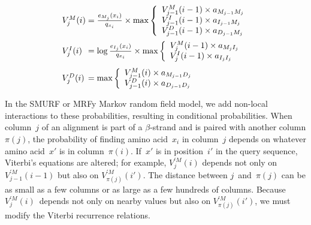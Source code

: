 \documentclass{acm_proc_article-sp}
\begin{document}
\newcommand\txprobj[3][]{a#1_{{#2}_{j-1}{#3}_j}}
\newcommand\txprobjj[3][]{a#1_{{#2}_{j-1}{#3}_j}}
\newcommand\alignwidth{\ensuremath C} %
\newcommand\pairedwith[1]{{\pi(#1)}}

\newcommand\vsum[2]{#2&{}+{}& #1}

\def\goo{18pt}
\def\gum{14pt}

\def\maxiquad{\hskip 1.2em\relax}
\begin{equation}
\begin{array}{@{}l@{}c@{}l}

V_{j}^{M}(i) &{}={}& \frac{e_{M_{j}}(x_{i})}{q_{x_{i}}} \times \max \left\{
  \begin{array}{l@{}c@{}l}
  V_{j-1}^{M}(i - 1) \times a_{M_{j-1}M_{j}}\\
  V_{j-1}^{I}(i - 1) \times a_{I_{j-1}M_{j}}\\
  V_{j-1}^{D}(i - 1) \times a_{D_{j-1}M_{j}}\\
  \end{array} \right.\\[\goo]
V_{j}^{I}(i) &=& \log\frac{e_{I_{j}}(x_{i})}{q_{x_{i}}} \times \max \left\{
  \begin{array}{l@{}c@{}l}
  V_{j}^{M}(i - 1) \times a_{M_{j}I_{j}}\\
  V_{j}^{I}(i - 1) \times a_{I_{j}I_{j}}\\
  \end{array} \right.\\[\gum]
V_{j}^{D}(i) &=& \max \left\{
  \begin{array}{l@{}c@{}l}
  V_{j-1}^{M}(i) \times a_{M_{j-1}D_{j}}\\
  V_{j-1}^{D}(i) \times a_{D_{j-1}D_{j}}\\
  \end{array} \right.\\

\end{array}
\end{equation}

In the SMURF or MRFy Markov random field model, we add non-local interactions 
to these
probabilities, resulting in conditional probabilities.
When column~$j$ of an alignment is part of a $\beta$-strand and is paired
with another column  $\pairedwith j$,
the probability of finding amino acid~$x_i$ in column~$j$ 
depends on whatever amino acid~$x'$  is in column~${\pairedwith i}$.
If~$x'$ is in position~$i'$ in the query sequence, Viterbi's
equations are altered; for example,
$V_{j}^{\prime M}(i)$ depends not only on
$V_{j-1}^{\prime M}(i-1)$ but also on
$V_{\pairedwith j}^{\prime M}(i')$.
The distance between $j$~and~$\pairedwith j$ can be as small as a few
columns or as large as a few hundreds of columns.
Because $V_j^{\prime M}(i)$~depends not only on nearby values but also on
$V_{\pairedwith j}^{\prime M}(i')$,
we must modify the Viterbi recurrence relations.
\end{document}
